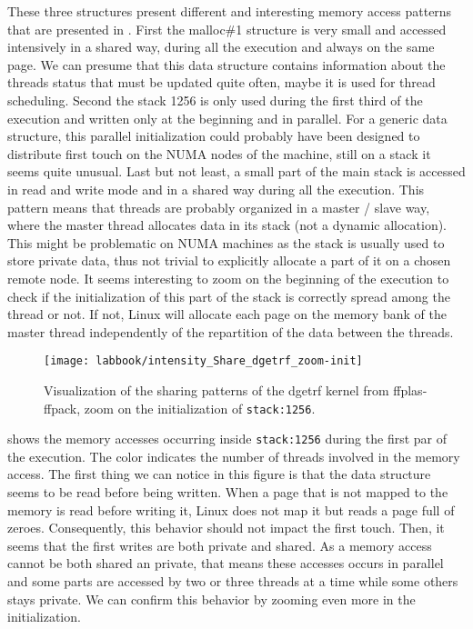 These three structures present different and interesting memory access patterns that are presented in .
First the malloc\#1 structure is very small and accessed intensively in a shared way, during all the execution and always on the same page.
We can presume that this data structure contains information about the threads status that must be updated quite often, maybe it is used for thread scheduling.
Second the stack 1256 is only used during the first third of the execution and written only at the beginning and in parallel.
For a generic data structure, this parallel initialization could probably have been designed to distribute first touch on the \gls{NUMA} nodes of the machine, still on a stack it seems quite unusual.
Last but not least, a small part of the main stack is accessed in read and write mode and in a shared way during all the execution.
This pattern means that threads are probably organized in a master / slave way, where the master thread allocates data in its stack (not a dynamic allocation).
This might be problematic on \gls{NUMA} machines as the stack is usually used to store private data, thus not trivial to explicitly allocate a part of it on a chosen remote node.
It seems interesting to zoom on the beginning of the execution to check if the initialization of this part of the stack is correctly spread among the thread or not.
If not, Linux will allocate each page on the memory bank of the master thread independently of the repartition of the data between the threads.

\begin{figure}[htb]
    \centering
    \texttt{[image: labbook/intensity\_Share\_dgetrf\_zoom-init]}
    \caption{Visualization of the sharing patterns of the dgetrf kernel from ffplas-ffpack, zoom on the initialization of \texttt{stack:1256}.}
    \label{fig:dgetrf-share-zoom-init}
\end{figure}

 shows the memory accesses occurring inside \texttt{stack:1256} during the first par of the execution.
The color indicates the number of threads involved in the memory access.
The first thing we can notice in this figure is that the data structure seems to be read before being written.
When a page that is not mapped to the memory is read before writing it, \gls{Linux} does not map it but reads a page full of zeroes.
Consequently, this behavior should not impact the first touch.
Then, it seems that the first writes are both private and shared.
As a memory access cannot be both shared an private, that means these accesses occurs in parallel and some parts are accessed by two or three threads at a time while some others stays private.
We can confirm this behavior by zooming even more in the initialization.

